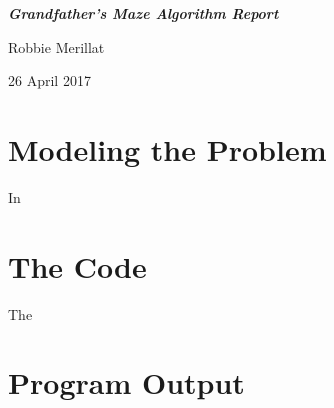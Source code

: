\documentclass[11pt]{article}
\newcommand\tab[1][.5in]{\hspace*{#1}}
\begin{document}
\begin{titlepage}
\vspace*{\fill}
{
    \centering
    \bfseries
    \emph{\Huge Grandfather's Maze Algorithm Report}
    \vskip 1.5in

    \Large Robbie Merillat \\
    \vskip 2in

    26 April 2017

}
\vspace*{\fill}
\clearpage
\end{titlepage}

\section{Modeling the Problem}
\tab In 
\section{The Code}
\tab The
\section{Program Output}
\end{document}
